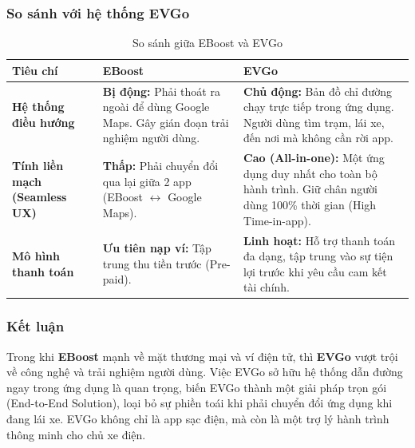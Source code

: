 \subsubsection{So sánh với hệ thống EVGo}
\begin{table}[H]
    \centering
    \caption{So sánh giữa EBoost và EVGo}
    \label{tab:compare_eboost_evgo}
    \begin{tabular}{|p{5cm}|p{5cm}|p{5cm}|}
        \hline
        	\textbf{Tiêu chí} & \textbf{EBoost} & \textbf{EVGo} \\
        \hline
        	\textbf{Hệ thống điều hướng} & \textbf{Bị động:} Phải thoát ra ngoài để dùng Google Maps. Gây gián đoạn trải nghiệm người dùng. & \textbf{Chủ động:} Bản đồ chỉ đường chạy trực tiếp trong ứng dụng. Người dùng tìm trạm, lái xe, đến nơi mà không cần rời app. \\
        \hline
        	\textbf{Tính liền mạch (Seamless UX)} & \textbf{Thấp:} Phải chuyển đổi qua lại giữa 2 app (EBoost $\leftrightarrow$ Google Maps). & \textbf{Cao (All-in-one):} Một ứng dụng duy nhất cho toàn bộ hành trình. Giữ chân người dùng 100\% thời gian (High Time-in-app). \\
        \hline
        	\textbf{Mô hình thanh toán} & \textbf{Ưu tiên nạp ví:} Tập trung thu tiền trước (Pre-paid). & \textbf{Linh hoạt:} Hỗ trợ thanh toán đa dạng, tập trung vào sự tiện lợi trước khi yêu cầu cam kết tài chính. \\
        \hline
    \end{tabular}
    
\end{table}

\subsubsection{Kết luận}
Trong khi \textbf{EBoost} mạnh về mặt 
thương mại và ví điện tử, thì \textbf{EVGo} 
vượt trội về công nghệ và trải nghiệm người dùng. Việc EVGo sở hữu hệ thống dẫn đường ngay trong ứng dụng là  quan trọng, biến EVGo thành một giải pháp trọn gói (End-to-End Solution), loại bỏ sự phiền toái khi phải chuyển 
đổi ứng dụng khi đang lái xe. EVGo không chỉ là app sạc điện, mà còn 
là một trợ lý hành trình thông minh cho chủ xe điện.